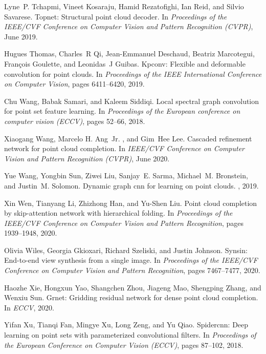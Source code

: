 \documentclass[final]{cvpr}
\begin{document}
{\begin{thebibliography}{10}
Lyne~P. Tchapmi, Vineet Kosaraju, Hamid Rezatofighi, Ian Reid, and Silvio
  Savarese.
\newblock Topnet: Structural point cloud decoder.
\newblock In {\em Proceedings of the IEEE/CVF Conference on Computer Vision and
  Pattern Recognition (CVPR)}, June 2019.

Hugues Thomas, Charles~R Qi, Jean-Emmanuel Deschaud, Beatriz Marcotegui,
  Fran{\c{c}}ois Goulette, and Leonidas~J Guibas.
\newblock Kpconv: Flexible and deformable convolution for point clouds.
\newblock In {\em Proceedings of the IEEE International Conference on Computer
  Vision}, pages 6411--6420, 2019.

Chu Wang, Babak Samari, and Kaleem Siddiqi.
\newblock Local spectral graph convolution for point set feature learning.
\newblock In {\em Proceedings of the European conference on computer vision
  (ECCV)}, pages 52--66, 2018.

Xiaogang Wang, Marcelo H. Ang~Jr.  , and Gim~Hee Lee.
\newblock Cascaded refinement network for point cloud completion.
\newblock In {\em IEEE/CVF Conference on Computer Vision and Pattern
  Recognition (CVPR)}, June 2020.

Yue Wang, Yongbin Sun, Ziwei Liu, Sanjay~E. Sarma, Michael~M. Bronstein, and
  Justin~M. Solomon.
\newblock Dynamic graph cnn for learning on point clouds.
, 2019.

Xin Wen, Tianyang Li, Zhizhong Han, and Yu-Shen Liu.
\newblock Point cloud completion by skip-attention network with hierarchical
  folding.
\newblock In {\em Proceedings of the IEEE/CVF Conference on Computer Vision and
  Pattern Recognition}, pages 1939--1948, 2020.

Olivia Wiles, Georgia Gkioxari, Richard Szeliski, and Justin Johnson.
\newblock Synsin: End-to-end view synthesis from a single image.
\newblock In {\em Proceedings of the IEEE/CVF Conference on Computer Vision and
  Pattern Recognition}, pages 7467--7477, 2020.

Haozhe Xie, Hongxun Yao, Shangchen Zhou, Jiageng Mao, Shengping Zhang, and
  Wenxiu Sun.
\newblock Grnet: Gridding residual network for dense point cloud completion.
\newblock In {\em ECCV}, 2020.

Yifan Xu, Tianqi Fan, Mingye Xu, Long Zeng, and Yu Qiao.
\newblock Spidercnn: Deep learning on point sets with parameterized
  convolutional filters.
\newblock In {\em Proceedings of the European Conference on Computer Vision
  (ECCV)}, pages 87--102, 2018.


\end{thebibliography}}
\end{document}

